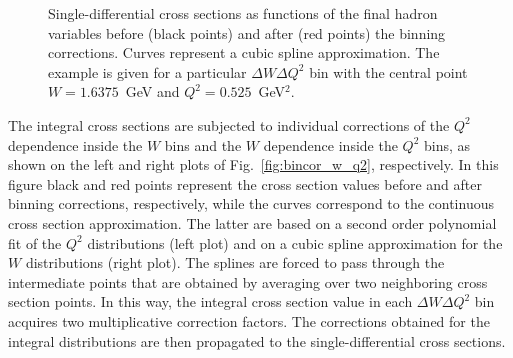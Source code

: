 \begin{figure}[htp]
\begin{center}
\caption{\small Single-differential cross sections as functions of the final hadron variables before (black points) and after (red points) the binning corrections. Curves represent a cubic spline approximation. The example is given for a particular $\Delta W \Delta Q^{2}$ bin with the central point $W=1.6375$~GeV and $Q^{2}=0.525$~GeV$^{2}$.  } \label{fig:bin_cor_1d}
\end{center}
\end{figure}



The integral cross sections are subjected to individual corrections of the $Q^{2}$ dependence inside the $W$ bins and the $W$ dependence inside the $Q^{2}$ bins, as shown on the left and right plots of Fig.~\ref{fig:bincor_w_q2}, respectively. In this figure black and red points represent the cross section values before and after binning corrections, respectively, while the curves correspond to the continuous cross section approximation. The latter are based on a second order polynomial fit of the $Q^{2}$ distributions (left plot) and on a cubic spline approximation for the $W$ distributions (right plot). The splines are forced to pass through the intermediate points that are obtained by averaging over two neighboring cross section points. In this way, the integral cross section value in each $\Delta W\Delta Q^{2}$ bin acquires two multiplicative correction factors. The corrections obtained for the integral distributions are then propagated to the single-differential cross sections.

